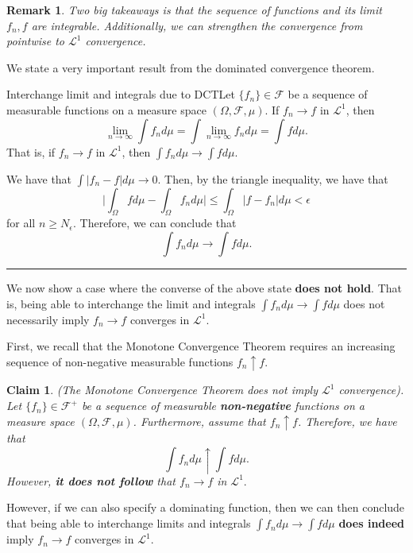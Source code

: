 \documentclass[twoside]{article}
\newtheorem{claim}[theorem]{Claim}
\newtheorem{remark}[theorem]{Remark}
\newenvironment{proof}{{\bf Proof:}}{\hfill\rule{2mm}{2mm}}
\newcommand{\sigmalgebra}{\mathcal{F}}
\begin{document}
\begin{remark} Two big takeaways is that the sequence of functions and its limit $f_n, f$ are integrable. Additionally, we can strengthen the convergence from pointwise to $\mathcal{L}^1$ convergence.
\end{remark}


We state a very important result from the dominated convergence theorem.

\begin{proposition_exam}{Interchange limit and integrals due to DCT}{}Let $\{f_n\} \in \sigmalgebra$ be a sequence of measurable functions on a measure space $(\Omega, \sigmalgebra, \mu)$. If $f_n \rightarrow f$ in $\mathcal{L}^1$, then $$\lim_{n \rightarrow \infty}\int f_nd\mu = \int \lim_{n \rightarrow \infty}f_nd\mu = \int fd\mu.$$ That is, if $f_n \rightarrow f$ in $\mathcal{L}^1$, then $\int f_nd\mu \rightarrow \int fd\mu.$
\end{proposition_exam}
\begin{proof} We have that $\int|f_n - f|d\mu \rightarrow 0$. Then, by the triangle inequality, we have that 
$$
\bigg|\int_{\Omega}fd\mu - \int_{\Omega}f_nd\mu \bigg| \leq \int_{\Omega}|f - f_n|d\mu < \epsilon
$$
for all $n \geq N_{\epsilon}.$ Therefore, we can conclude that 
$$
\int f_nd\mu \rightarrow \int fd\mu.
$$
\end{proof}

We now show a case where the converse of the above state \textbf{does not hold}. That is, being able to interchange the limit and integrals $\int f_nd\mu \rightarrow \int fd\mu$ does not necessarily imply $f_n \rightarrow f$ converges in $\mathcal{L}^1$. 

First, we recall that the Monotone Convergence Theorem requires an increasing sequence of non-negative measurable functions $f_n \uparrow f.$

\begin{claim}(The Monotone Convergence Theorem does not imply $\mathcal{L}^1$ convergence). Let $\{f_n\} \in \sigmalgebra^+$ be a sequence of measurable \textbf{non-negative} functions on a measure space $(\Omega, \mathcal{F}, \mu)$. Furthermore, assume that $f_n \uparrow f$. Therefore, we have that $$\int f_nd\mu \uparrow \int fd\mu.$$ However, \textbf{it does not follow} that $f_n \rightarrow f$ in $\mathcal{L}^1.$
\end{claim}


However, if we can also specify a dominating function, then we can then conclude that being able to interchange limits and integrals $\int f_nd\mu \rightarrow \int fd\mu$ \textbf{does indeed} imply $f_n \rightarrow f$ converges in $\mathcal{L}^1$.
\end{document}
